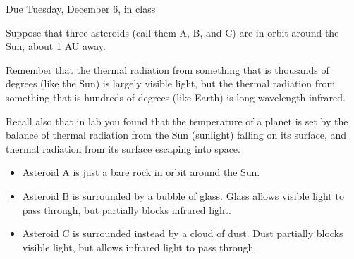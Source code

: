 \documentclass[12pt]{article}
\begin{document}
\Large
\centerline{}

\normalsize
\begin{center}
	Due Tuesday, December 6, in class
\end{center}

\bigskip

        Suppose that three asteroids (call them A, B, and C) are in orbit around the Sun, about 1 AU away. 

	\bigskip

	Remember that the thermal radiation from something that is thousands of degrees (like the Sun) is largely visible
	light, but the thermal radiation from something that is hundreds of degrees (like Earth) is long-wavelength infrared.
\bigskip

	Recall also that in lab you found that the temperature of a planet is set by the balance of thermal radiation from the Sun (sunlight) falling on its surface, and thermal radiation from its surface escaping into space.
\bigskip
\begin{itemize}

    \item	Asteroid A is just a bare rock in orbit around the Sun.

    \item Asteroid B is surrounded by a bubble of glass. Glass allows visible light to pass through, but partially blocks infrared light.

    \item	Asteroid C is surrounded instead by a cloud of dust. Dust partially blocks visible light, but allows infrared light to pass through.
\end{itemize}
\end{document}
